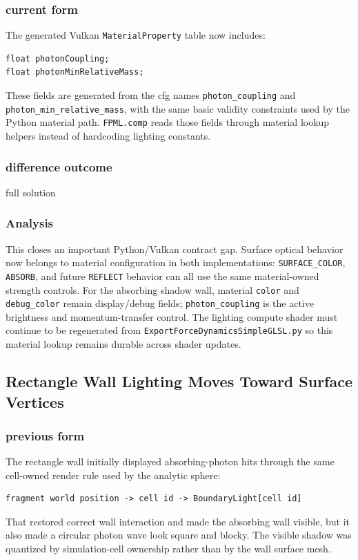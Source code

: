 \subsubsection{current form}

The generated Vulkan \texttt{MaterialProperty} table now includes:
\begin{verbatim}
float photonCoupling;
float photonMinRelativeMass;
\end{verbatim}
These fields are generated from the cfg names
\texttt{photon\_coupling} and \texttt{photon\_min\_relative\_mass}, with the
same basic validity constraints used by the Python material path.
\texttt{FPML.comp} reads those fields through material lookup helpers instead
of hardcoding lighting constants.

\subsubsection{difference outcome}

full solution

\subsubsection{Analysis}

This closes an important Python/Vulkan contract gap.  Surface optical
behavior now belongs to material configuration in both implementations:
\texttt{SURFACE\_COLOR}, \texttt{ABSORB}, and future \texttt{REFLECT}
behavior can all use the same material-owned strength controls.  For the
absorbing shadow wall, material \texttt{color} and \texttt{debug\_color}
remain display/debug fields; \texttt{photon\_coupling} is the active
brightness and momentum-transfer control.  The lighting compute shader must
continue to be regenerated from \texttt{ExportForceDynamicsSimpleGLSL.py} so
this material lookup remains durable across shader updates.

\subsection{Rectangle Wall Lighting Moves Toward Surface Vertices}

\subsubsection{previous form}

The rectangle wall initially displayed absorbing-photon hits through the same
cell-owned render rule used by the analytic sphere:
\begin{verbatim}
fragment world position -> cell id -> BoundaryLight[cell id]
\end{verbatim}
That restored correct wall interaction and made the absorbing wall visible,
but it also made a circular photon wave look square and blocky.  The visible
shadow was quantized by simulation-cell ownership rather than by the wall
surface mesh.

